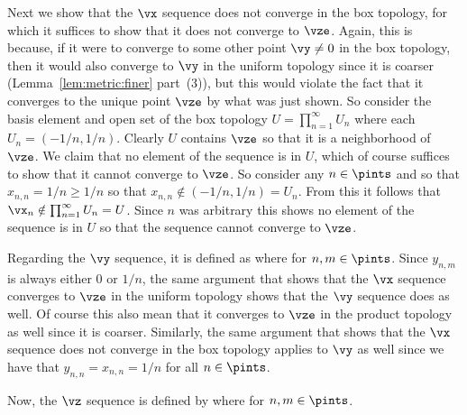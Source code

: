 {{    Next we show that the $\vx$ sequence does not converge in the box topology, for which it suffices to show that it does not converge to $\vze$.
    Again, this is because, if it were to converge to some other point $\vy \neq 0$ in the box topology, then it would also converge to $\vy$ in the uniform topology since it is coarser (Lemma~\ref{lem:metric:finer} part~(3)), but this would violate the fact that it converges to the unique point $\vze$ by what was just shown.
    So consider the basis element and open set of the box topology $U = \prod_{n=1}^\infty U_n$ where each $U_n = (-1/n, 1/n)$.
    Clearly $U$ contains $\vze$ so that it is a neighborhood of $\vze$.
    We claim that no element of the sequence is in $U$, which of course suffices to show that it cannot converge to $\vze$.
    So consider any $n \in \pints$ and so that $x_{n,n} = 1/n \geq 1/n$ so that $x_{n,n} \notin (-1/n, 1/n) = U_n$.
    From this it follows that $\vx_n \notin \prod_{n=1}^\infty U_n = U$.
    Since $n$ was arbitrary this shows no element of the sequence is in $U$ so that the sequence cannot converge to $\vze$.

    Regarding the $\vy$ sequence, it is defined as
    where
    for $n,m \in \pints$.
    Since $y_{n,m}$ is always either $0$ or $1/n$, the same argument that shows that the $\vx$ sequence converges to $\vze$ in the uniform topology shows that the $\vy$ sequence does as well.
    Of course this also mean that it converges to $\vze$ in the product topology as well since it is coarser.
    Similarly, the same argument that shows that the $\vx$ sequence does not converge in the box topology applies to $\vy$ as well since we have that $y_{n,n} = x_{n,n} = 1/n$ for all $n \in \pints$.

    Now, the $\vz$ sequence is defined by
    where
    for $n,m \in \pints$.

}}
